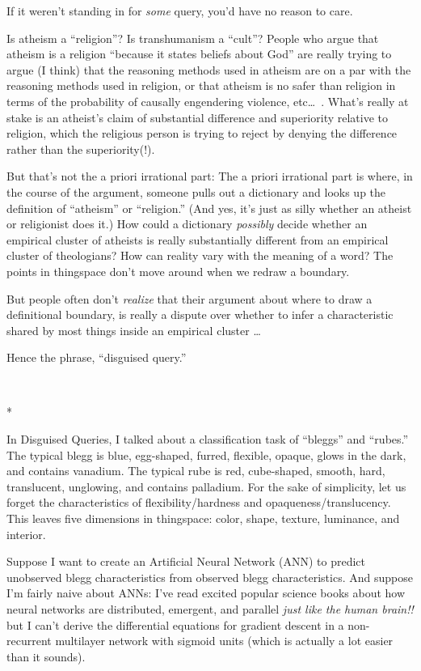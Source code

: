 {
 If it weren't standing in for \textit{some} query,
you'd have no reason to care.}

{
 Is atheism a ``religion''? Is
transhumanism a ``cult''? People who
argue that atheism is a religion ``because it states
beliefs about God'' are really trying to argue (I
think) that the reasoning methods used in atheism are on a par with the
reasoning methods used in religion, or that atheism is no safer than
religion in terms of the probability of causally engendering violence,
etc\ldots~. What's really at stake is an
atheist's claim of substantial difference and
superiority relative to religion, which the religious person is trying
to reject by denying the difference rather than the superiority(!).}

{
 But that's not the a priori irrational part: The a
priori irrational part is where, in the course of the argument, someone
pulls out a dictionary and looks up the definition of
``atheism'' or
``religion.'' (And yes,
it's just as silly whether an atheist or religionist
does it.) How could a dictionary \textit{possibly} decide whether an
empirical cluster of atheists is really substantially different from an
empirical cluster of theologians? How can reality vary with the meaning
of a word? The points in thingspace don't move around
when we redraw a boundary.}

{
 But people often don't \textit{realize} that their
argument about where to draw a definitional boundary, is really a
dispute over whether to infer a characteristic shared by most things
inside an empirical cluster \ldots}

{
 Hence the phrase, ``disguised
query.''}

{\centering
 \ ~
\par}

{\centering
 *
\par}


{
 In Disguised Queries, I talked about a classification task of
``bleggs'' and
``rubes.'' The typical blegg is
blue, egg-shaped, furred, flexible, opaque, glows in the dark, and
contains vanadium. The typical rube is red, cube-shaped, smooth, hard,
translucent, unglowing, and contains palladium. For the sake of
simplicity, let us forget the characteristics of flexibility/hardness
and opaqueness/translucency. This leaves five dimensions in thingspace:
color, shape, texture, luminance, and interior. }

{
 Suppose I want to create an Artificial Neural Network (ANN) to
predict unobserved blegg characteristics from observed blegg
characteristics. And suppose I'm fairly naive about
ANNs: I've read excited popular science books about how
neural networks are distributed, emergent, and parallel \textit{just
like the human brain!!} but I can't derive the
differential equations for gradient descent in a non-recurrent
multilayer network with sigmoid units (which is actually a lot easier
than it sounds).}

